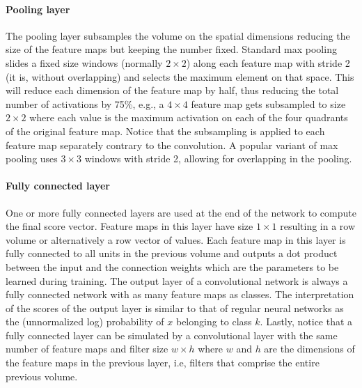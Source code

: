 \paragraph{Pooling layer} The pooling layer subsamples the volume on the spatial dimensions reducing the size of the feature maps but keeping the number fixed. Standard max pooling slides a fixed size windows (normally $2\times2$) along each feature map with stride 2 (it is, without overlapping) and selects the maximum element on that space. This will reduce each dimension of the feature map by half, thus reducing the total number of activations by 75\%, e.g., a $4\times4$ feature map gets subsampled to size $2\times 2$ where each value is the maximum activation on each of the four quadrants of the original feature map. Notice that the subsampling is applied to each feature map separately contrary to the convolution. A popular variant of max pooling uses $3\times 3$ windows with stride 2, allowing for overlapping in the pooling.

\paragraph{Fully connected layer} One or more fully connected layers are used at the end of the network to compute the final score vector. Feature maps in this layer have size $1 \times 1$ resulting in a row volume or alternatively a row vector of values. Each feature map in this layer is fully connected to all units in the previous volume and outputs a dot product between the input and the connection weights which are the parameters to be learned during training. The output layer of a convolutional network is always a fully connected network with as many feature maps as classes. The interpretation of the scores of the output layer is similar to that of regular neural networks as the (unnormalized log) probability of $x$ belonging to class $k$. Lastly, notice that a fully connected layer can be simulated by a convolutional layer with the same number of feature maps and filter size $w\times h$ where $w$ and $h$ are the dimensions of the feature maps in the previous layer, i.e, filters that comprise the entire previous volume.

